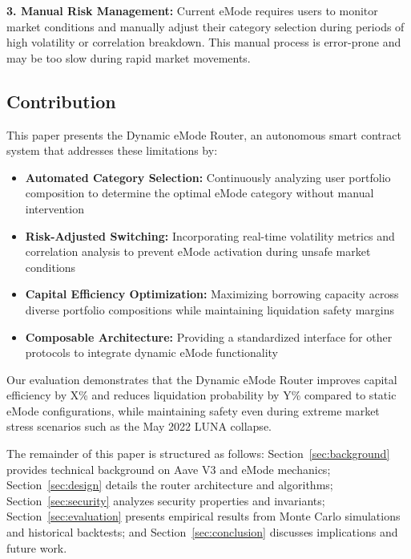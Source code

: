 \textbf{3. Manual Risk Management:} Current eMode requires users to monitor market conditions and manually adjust their category selection during periods of high volatility or correlation breakdown. This manual process is error-prone and may be too slow during rapid market movements.

\subsection{Contribution}

This paper presents the Dynamic eMode Router, an autonomous smart contract system that addresses these limitations by:

\begin{itemize}
    \item \textbf{Automated Category Selection:} Continuously analyzing user portfolio composition to determine the optimal eMode category without manual intervention
    \item \textbf{Risk-Adjusted Switching:} Incorporating real-time volatility metrics and correlation analysis to prevent eMode activation during unsafe market conditions
    \item \textbf{Capital Efficiency Optimization:} Maximizing borrowing capacity across diverse portfolio compositions while maintaining liquidation safety margins
    \item \textbf{Composable Architecture:} Providing a standardized interface for other protocols to integrate dynamic eMode functionality
\end{itemize}

Our evaluation demonstrates that the Dynamic eMode Router improves capital efficiency by X\% and reduces liquidation probability by Y\% compared to static eMode configurations, while maintaining safety even during extreme market stress scenarios such as the May 2022 LUNA collapse.

The remainder of this paper is structured as follows: Section~\ref{sec:background} provides technical background on Aave V3 and eMode mechanics; Section~\ref{sec:design} details the router architecture and algorithms; Section~\ref{sec:security} analyzes security properties and invariants; Section~\ref{sec:evaluation} presents empirical results from Monte Carlo simulations and historical backtests; and Section~\ref{sec:conclusion} discusses implications and future work.
